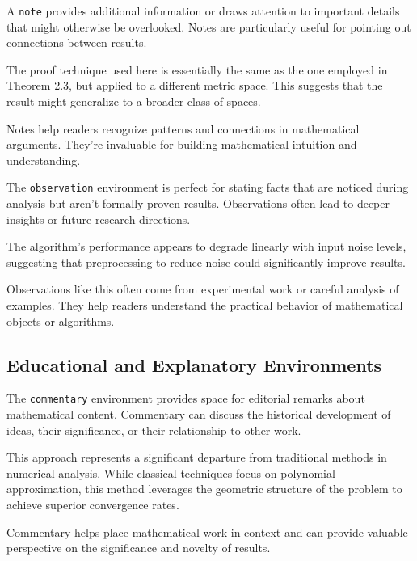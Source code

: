 \documentclass[9pt]{amsart}
\begin{document}
A \texttt{note} provides additional information or draws attention to important
details that might otherwise be overlooked. Notes are particularly useful for
pointing out connections between results.

\begin{note}
	The proof technique used here is essentially the same as the one employed in Theorem 2.3, but applied to a different metric space. This suggests that the result might generalize to a broader class of spaces.
\end{note}

Notes help readers recognize patterns and connections in mathematical
arguments. They're invaluable for building mathematical intuition and
understanding.

The \texttt{observation} environment is perfect for stating facts that are
noticed during analysis but aren't formally proven results. Observations often
lead to deeper insights or future research directions.

\begin{observation}
	The algorithm's performance appears to degrade linearly with input noise levels, suggesting that preprocessing to reduce noise could significantly improve results.
\end{observation}

Observations like this often come from experimental work or careful analysis of
examples. They help readers understand the practical behavior of mathematical
objects or algorithms.

\subsection{Educational and Explanatory Environments}

The \texttt{commentary} environment provides space for editorial remarks about
mathematical content. Commentary can discuss the historical development of
ideas, their significance, or their relationship to other work.

\begin{commentary}
	This approach represents a significant departure from traditional methods in numerical analysis. While classical techniques focus on polynomial approximation, this method leverages the geometric structure of the problem to achieve superior convergence rates.
\end{commentary}

Commentary helps place mathematical work in context and can provide valuable
perspective on the significance and novelty of results.
\end{document}
